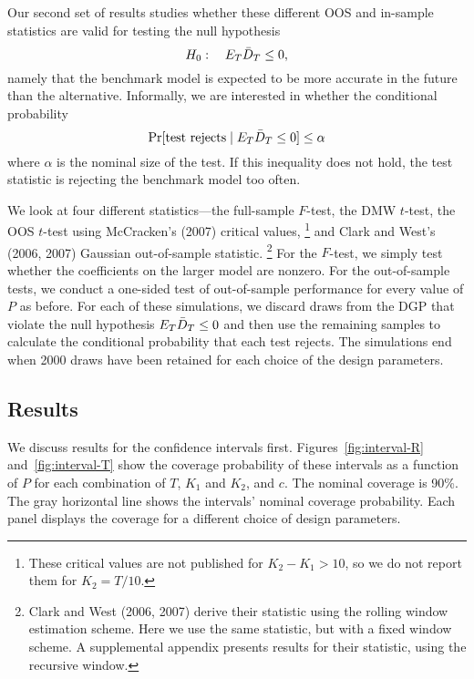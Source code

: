 \documentclass[12pt]{article}
\begin{document}
Our second set of results studies whether these different OOS and
in-sample statistics are valid for testing the null hypothesis
\begin{equation*}
  H_0:\quad E_T \bar{D}_{T} \leq 0,
\end{equation*}
namely that the benchmark model is expected to be more accurate in the
future than the alternative. Informally, we are interested in whether
the conditional probability
\begin{equation*}
  \Pr[\text{test rejects} \mid E_T \bar{D}_{T} \leq 0] \leq \alpha
\end{equation*}
where $\alpha$ is the nominal size of the test. If this inequality
does not hold, the test statistic is rejecting the benchmark model too
often.

We look at four different statistics---the full-sample $F$-test, the
DMW $t$-test, the OOS $t$-test using McCracken's (2007) critical
values,%
\footnote{These critical values are not published for $K_2-K_1>10$, so
  we do not report them for $K_2 = T/10$.} %
and Clark and West's (2006, 2007) Gaussian out-of-sample statistic.%
\footnote{Clark and West (2006, 2007) derive their statistic using the
  rolling window estimation scheme. Here we use the same statistic,
  but with a fixed window scheme. A supplemental appendix presents
  results for their statistic, using the recursive window.} %
For the $F$-test, we simply test whether the coefficients on the
larger model are nonzero.  For the out-of-sample tests, we conduct a
one-sided test of out-of-sample performance for every value of $P$ as
before. For each of these simulations, we discard draws from the DGP
that violate the null hypothesis $E_T \bar{D}_{T} \leq 0$ and then use the
remaining samples to calculate the conditional probability that each
test rejects. The simulations end when 2000 draws have been retained
for each choice of the design parameters.

\subsection{Results}

We discuss results for the confidence intervals first.
Figures~\ref{fig:interval-R} and~\ref{fig:interval-T} show the
coverage probability of these intervals as a function of $P$ for each
combination of $T$, $K_1$ and $K_2$, and $c$.  The nominal coverage is
90\%.  The gray horizontal line shows the intervals' nominal coverage
probability.  Each panel displays the coverage for a different choice
of design parameters.
\end{document}

